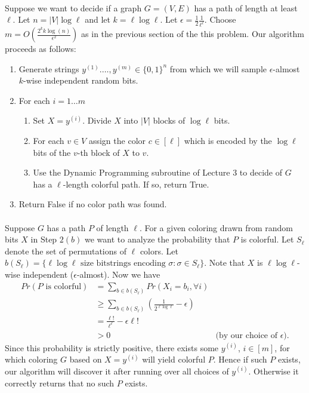 \documentclass[letterpaper,12pt,oneside,onecolumn]{article}
\begin{document}
\paragraph{}
Suppose we want to decide if a graph $G=(V,E)$ has a path of length at least $\ell$. Let $n=|V|\log\ell$ and let $k = \ell\log\ell$. Let $\epsilon = \frac{1}{2}\frac{1}{\ell^\ell}$. Choose $m = O(\frac{2^kk\log(n)}{\epsilon^2})$ as in the previous section of the this problem. Our algorithm proceeds as follows:
\begin{enumerate}
    \item Generate strings $y^{(1)}. \dots, y^{(m)} \in \{0,1\}^n$ from which we will sample $\epsilon$-almost $k$-wise independent random bits.
    \item For each $i = 1\dots m$
        \begin{enumerate}
            \item Set $X=y^{(i)}$. Divide $X$ into $|V|$ blocks of $\log\ell$ bits.
            \item For each $v \in V$ assign the color $c\in [\ell]$ which is encoded by the $\log\ell$ bits of the $v$-th block of $X$ to $v$. 
            \item Use the Dynamic Programming subroutine of Lecture $3$ to decide of $G$ has a $\ell$-length colorful path. If so, return True.
        \end{enumerate}
    \item Return False if no color path was found.
\end{enumerate}
\paragraph{}
Suppose $G$ has a path $P$ of length $\ell$. For a given coloring drawn from random bits $X$ in Step $2(b)$ we want to analyze the probability that $P$ is colorful. Let $S_\ell$ denote the set of permutations of $\ell$ colors. Let $b(S_\ell) = \{ \ell\log\ell \text{ size bitstrings encoding } \sigma : \sigma \in S_\ell\}$. Note that $X$ is $\ell\log\ell$-wise independent ($\epsilon$-almost). Now we have
\begin{align*}
    Pr(P\text{ is colorful}) &= \sum_{b \in b(S_\ell)} Pr(X_i = b_i, \forall i) \\
    &\geq \sum_{b \in b(S_\ell)} (\frac{1}{2^{\ell\log\ell}}-\epsilon) \\
    &=\frac{\ell!}{\ell^\ell} - \epsilon\ell! \\
    &> 0 &\text{(by our choice of $\epsilon$).}
\end{align*}
Since this probability is strictly positive, there exists some $y^{(i)}$, $i\in[m]$, for which coloring $G$ based on $X = y^{(i)}$ will yield colorful $P$. Hence if such $P$ exists, our algorithm will discover it after running over all choices of $y^(i)$. Otherwise it correctly returns that no such $P$ exists.
\end{document}
